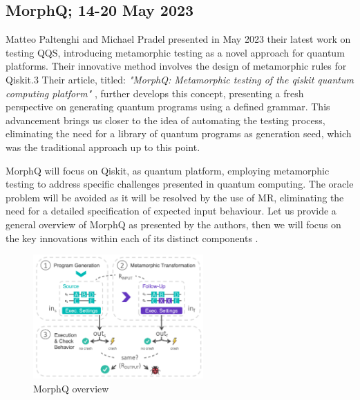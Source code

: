 \begin{itemize}
\subsection{MorphQ; 14-20 May 2023}
\label{Ch3.1.2:MorphQ}
Matteo Paltenghi and Michael Pradel presented in May 2023 their latest work on testing QQS, introducing metamorphic testing as a novel approach for quantum platforms. Their innovative method involves the design of metamorphic rules for Qiskit.3 Their article, titled: \textit{"MorphQ: Metamorphic testing of the qiskit quantum computing platform"} \cite{paltenghi2023morphq}, further develops this concept, presenting a fresh perspective on generating quantum programs using a defined grammar. This advancement brings us closer to the idea of automating the testing process, eliminating the need for a library of quantum programs as generation seed, which was the traditional approach up to this point.\newline

MorphQ will focus on Qiskit, as quantum platform, employing metamorphic testing to address specific challenges presented in quantum computing. The oracle problem will be avoided as it will be resolved by the use of MR, eliminating the need for a detailed specification of expected input behaviour. Let us provide a general overview of MorphQ as presented by the authors, then we will focus on the key innovations within each of its distinct components .

\begin{figure}[H]
        \centering
        \includegraphics[width=0.58\textwidth]{TFM/photos/MorphQOverview.png}
        \caption{MorphQ overview \cite{paltenghi2023morphq}} 
        \label{Fig:MorphQOverview}
\end{figure}


\end{itemize}
